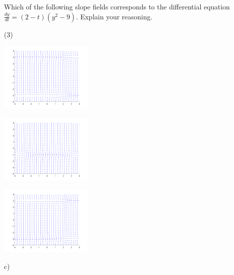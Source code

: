 \begin{exercise}
Which of the following slope fields corresponds to the differential equation $\frac{dy}{dt} = (2-t)(y^2 - 9)$. Explain your reasoning.
\begin{tasks}(3)
\task
\parbox[c]{1.75in}{\includegraphics[width=1.75in]{Images/yprimetm2ysqm9slope}}
\task
\parbox[c]{1.75in}{\includegraphics[width=1.75in]{Images/yprimeyp1tsqm9slope}}
\task
\parbox[c]{1.75in}{\includegraphics[width=1.75in]{Images/yprime2mtysqm9slope}}
\end{tasks}
\end{exercise}
\comboSol{%
}
{%
c)
}


\newpage

